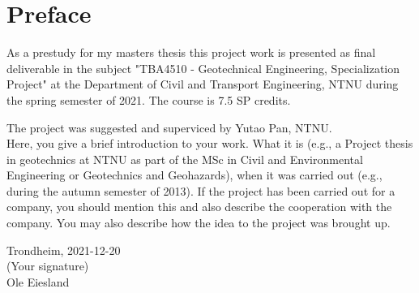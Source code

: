 \section*{Preface}
As a prestudy for my masters thesis this project work is presented as final deliverable in the subject "TBA4510 - Geotechnical Engineering, Specialization Project" at the Department of Civil and Transport Engineering, NTNU during the spring semester of 2021. 
The course is 7.5 SP credits.

The project was suggested and superviced by Yutao Pan, NTNU.
\\
Here, you give a brief introduction to your work. What it is (e.g., a Project thesis in geotechnics at NTNU as part of the MSc in Civil and Environmental Engineering or Geotechnics and Geohazards), when it was carried out (e.g., during the autumn semester of 2013). If the project has been carried out for a company, you should mention this and also describe the cooperation with the company. You may also describe how the idea to the project was brought up.\\[2cm]

\begin{center}
Trondheim, 2021-12-20\\[1pc]
(Your signature)\\[1pc]
Ole Eiesland
\end{center}
